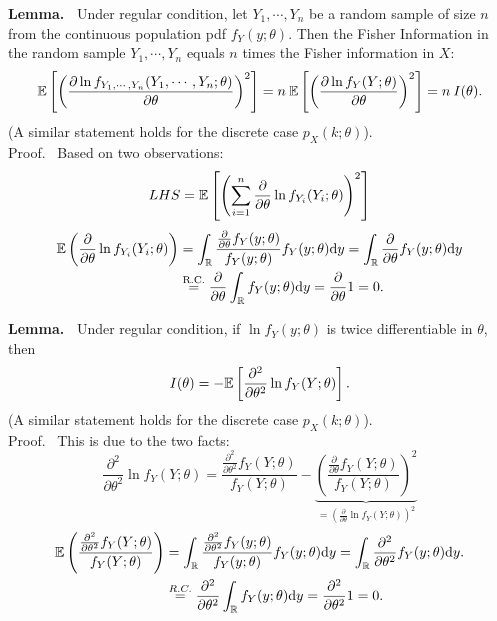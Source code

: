  \begin{frame}

 {\bf Lemma.~} Under regular condition, let $Y_1,\cdots,Y_n$ be a random sample of size $n$ from the continuous population pdf $f_Y(y;\theta)$. Then the Fisher Information in the random sample $Y_1,\cdots,Y_n$ equals $n$ times the Fisher information in $X$:
 \begin{align}\label{E:Fisher1}
 \mathbb{E}\left[\left(\frac{\partial \ln f_{Y_1,\cdots,Y_n}(Y_1,\cdots,Y_n;\theta)}{\partial \theta}\right)^2\right] = n\:  \mathbb{E}\left[\left(\frac{\partial \ln f_Y(Y;\theta)}{\partial \theta}\right)^2\right] = n \: I(\theta).
 \end{align}
 (A similar statement holds for the  discrete case $p_X(k;\theta)$).\\[1em]

 \pause
 {Proof.~} Based on two observations:
 \[
 LHS = \mathbb{E}\left[\left(
 \sum_{i=1}^n \frac{\partial}{\partial \theta} \ln f_{Y_i}(Y_i;\theta)
 \right)^2\right]
 \]
 \begin{align*}
 \mathbb{E}\left(\frac{\partial}{\partial \theta} \ln f_{Y_i}(Y_i;\theta)\right)
&  = \int_{\mathbb{R}} \frac{\frac{\partial}{\partial \theta}f_Y(y;\theta)}{f_Y(y;\theta)} f_Y(y;\theta)\mathrm{d} y = \int_{\mathbb{R}} \frac{\partial}{\partial \theta}f_Y(y;\theta)\mathrm{d} y \\
& \stackrel{\text{R.C.}}{=} \frac{\partial}{\partial \theta} \int_{\mathbb{R}} f_Y(y;\theta)\mathrm{d} y  = \frac{\partial}{\partial \theta} 1 = 0.
 \end{align*}
\myEnd
 \end{frame}
 \begin{frame}

  {\bf Lemma.~} Under regular condition, if $\ln f_Y(y;\theta)$ is twice differentiable in $\theta$, then
  \begin{align}\label{E:Fisher2}
  I(\theta) = -\mathbb{E}\left[\frac{\partial^2}{\partial \theta^2}\ln f_Y(Y;\theta)\right].
  \end{align}
(A similar statement holds for the  discrete case $p_X(k;\theta)$).\\[1em]

 \pause
 {Proof.~} This is due to the two facts:
 \[
 \frac{\partial^2}{\partial \theta^2}\ln f_Y(Y;\theta) = \frac{\frac{\partial^2}{\partial \theta^2}f_Y(Y;\theta)}{f_Y(Y;\theta)}
 -\underbrace{\left(\frac{\frac{\partial}{\partial \theta}f_Y(Y;\theta)}{f_Y(Y;\theta)}\right)^2}_{\displaystyle
 =\left(\frac{\partial}{\partial \theta} \ln f_Y(Y;\theta)\right)^2}
 \]
 \begin{align*}
 \mathbb{E}\left(\frac{\frac{\partial^2}{\partial \theta^2}f_Y(Y;\theta)}{f_Y(Y;\theta)}\right) &= \int_{\mathbb{R}} \frac{\frac{\partial^2}{\partial \theta^2}f_Y(y;\theta)}{f_Y(y;\theta)}f_Y(y;\theta) \mathrm{d} y =
 \int_{\mathbb{R}} \frac{\partial^2}{\partial \theta^2}f_Y(y;\theta) \mathrm{d} y.\\
 &\stackrel{R.C.}{=} \frac{\partial^2}{\partial \theta^2} \int_{\mathbb{R}} f_Y(y;\theta) \mathrm{d} y  = \frac{\partial^2}{\partial \theta^2} 1 = 0.
 \end{align*}
 \myEnd
 \end{frame}
